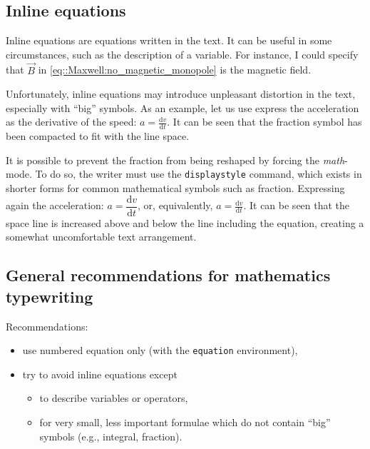 \documentclass[11pt, a4paper, english]{report}
\begin{document}
		
		\subsection{Inline equations}
		
			Inline equations are equations written in the text.
			It can be useful in some circumstances, such as the description of a variable.
			For instance, I could specify that $\vec{B}$ in \cref{eq::Maxwell:no_magnetic_monopole} is the magnetic field.
			
			Unfortunately, inline equations may introduce unpleasant distortion in the text, especially with \enquote{big} symbols.
			As an example, let us use express the acceleration as the derivative of the speed:
			$a=\frac{\mathrm{d}v}{\mathrm{d}t}$.
			It can be seen that the fraction symbol has been compacted to fit with the line space.
			
			It is possible to prevent the fraction from being reshaped by forcing the \textit{math}-mode.
			To do so, the writer must use the \texttt{displaystyle} command, which exists in shorter forms for common mathematical symbols such as fraction.
			Expressing again the acceleration:
			$a=\dfrac{\mathrm{d}v}{\mathrm{d}t}$, or, equivalently,
			$\displaystyle a=\frac{\mathrm{d}v}{\mathrm{d}t}$.
			It can be seen that the space line is increased above and below the line including the equation, creating a somewhat uncomfortable text arrangement.
			
			
		\subsection{General recommendations for mathematics typewriting}
			
			Recommendations:
			\begin{itemize}
				\item use numbered equation only (with the \texttt{equation} environment),
				\item try to avoid inline equations except
				\begin{itemize}
					\item to describe variables or operators,
					\item for very small, less important formulae which do not contain \enquote{big} symbols (e.g., integral, fraction).
				\end{itemize}
			\end{itemize}
%
\end{document}
